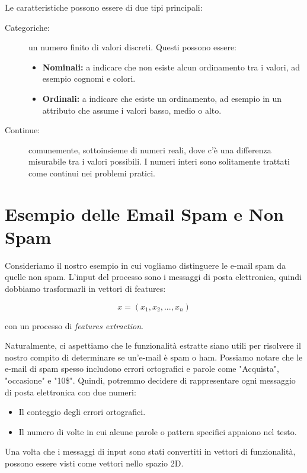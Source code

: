 \noindent
Le caratteristiche possono essere di due tipi principali:

\begin{description}
    \item[Categoriche:] un numero finito di valori discreti. Questi possono essere:
    \begin{itemize}
        \item \textbf{Nominali:} a indicare che non esiste alcun ordinamento tra i valori, ad esempio cognomi e colori.
        \item \textbf{Ordinali:} a indicare che esiste un ordinamento, ad esempio in un attributo che assume i valori basso, medio o alto.
    \end{itemize}
    \item[Continue:] comunemente, sottoinsieme di numeri reali, dove c'è una differenza misurabile tra i valori possibili. I numeri interi sono solitamente trattati come continui nei problemi pratici.
\end{description}

\section{Esempio delle Email Spam e Non Spam}

Consideriamo il nostro esempio in cui vogliamo distinguere le e-mail spam da quelle non spam.
L'input del processo sono i messaggi di posta elettronica, quindi dobbiamo trasformarli in vettori di features:

$$ x = (x_1, x_2, ..., x_n)$$

\noindent
con un processo di \emph{features extraction}.

Naturalmente, ci aspettiamo che le funzionalità estratte siano utili per risolvere il nostro compito di determinare se un'e-mail è spam o ham. Possiamo notare che le e-mail di spam spesso includono errori ortografici e parole come "Acquista", "occasione" e "10\$". Quindi, potremmo decidere di rappresentare ogni messaggio di posta elettronica con due numeri:

\begin{itemize}
    \item Il conteggio degli errori ortografici.
    \item Il numero di volte in cui alcune parole o pattern specifici appaiono nel testo.
\end{itemize}

Una volta che i messaggi di input sono stati convertiti in vettori di funzionalità, possono essere visti come vettori nello spazio 2D.

